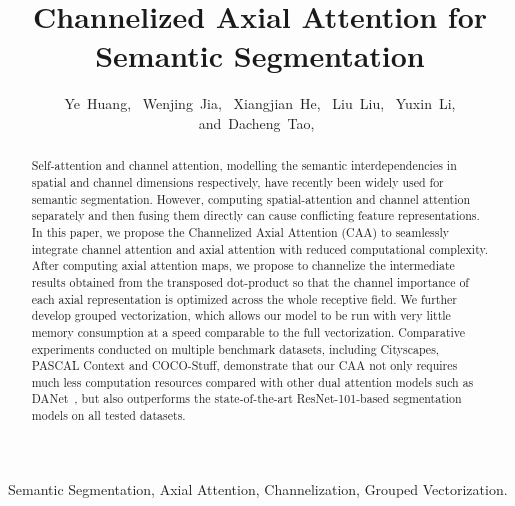 \documentclass[journal]{IEEEtran}
\begin{document}
\title{Channelized Axial Attention for Semantic Segmentation}


\author{Ye~Huang,~
        Wenjing~Jia,~
        Xiangjian~He,~
        Liu~Liu,~
        Yuxin~Li,
        and~Dacheng~Tao,~}



















\maketitle

\begin{abstract}
Self-attention and channel attention, modelling the semantic interdependencies in spatial and channel dimensions respectively, have recently been widely used for semantic segmentation.
However, computing spatial-attention  and channel attention separately and then fusing them directly can cause conflicting feature representations. 
In this paper, we propose the Channelized Axial Attention (CAA) to seamlessly integrate channel attention and axial attention with reduced computational complexity. 
After computing axial attention maps, we propose to channelize the intermediate results obtained from the transposed dot-product so that the channel importance of each axial representation is optimized across the whole receptive field. 
We further develop grouped vectorization, which allows our model to be run with very little memory consumption at a speed comparable to the full vectorization. 
Comparative experiments conducted on multiple benchmark datasets, including Cityscapes, PASCAL Context and COCO-Stuff, demonstrate that our CAA not only requires much less computation resources compared with other dual attention models such as DANet~\cite{cDualAttention}, but also outperforms the state-of-the-art ResNet-101-based segmentation models on all tested datasets.
\end{abstract}

\begin{IEEEkeywords}
Semantic Segmentation, Axial Attention, Channelization, Grouped Vectorization.
\end{IEEEkeywords}
\end{document}
